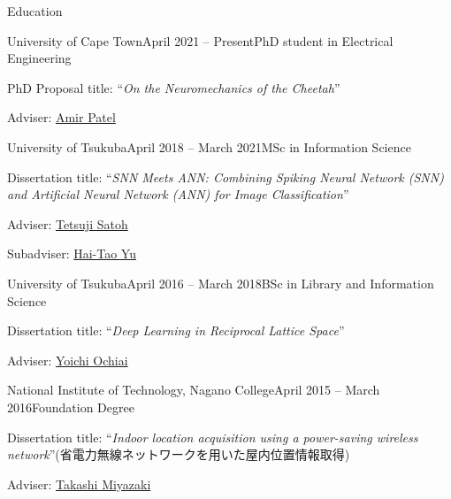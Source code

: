 \documentclass{resume} %
\begin{document}

\begin{rSection}{Education}

    \begin{rSubsection}{University of Cape Town}{April 2021 -- Present}{PhD student in Electrical Engineering}{}
    \item PhD Proposal title: ``{\it On the Neuromechanics of the Cheetah}''
    \item Adviser: \href{https://scholar.google.co.za/citations?user=RxMigV4AAAAJ&view_op=list_works&sortby=pubdate}{Amir Patel}
    \end{rSubsection}

    \begin{rSubsection}{University of Tsukuba}{April 2018 -- March 2021}{MSc in Information Science}{}
    \item Dissertation title: ``{\it SNN Meets ANN: Combining Spiking Neural Network (SNN) and Artificial Neural Network (ANN) for Image Classification}''
    \item Adviser: \href{http://www.slis.tsukuba.ac.jp/~satoh.tetsuji.gf/index.html}{Tetsuji Satoh}
    \item Subadviser: \href{https://scholar.google.co.jp/citations?user=88b2NRsAAAAJ&hl=ja}{Hai-Tao Yu}
    \end{rSubsection}

    \begin{rSubsection}{University of Tsukuba}{April 2016 -- March 2018}{BSc in Library and Information Science}{}
    \item Dissertation title: ``{\it Deep Learning in Reciprocal Lattice Space}''
    \item Adviser: \href{https://scholar.google.co.jp/citations?user=obhH0jkAAAAJ&hl=en}{Yoichi Ochiai}
    \end{rSubsection}

    \begin{rSubsection}{National Institute of Technology, Nagano College}{April 2015 -- March 2016}{Foundation Degree}{}
    \item Dissertation title: ``{\it Indoor location acquisition using a power-saving wireless network}''(省電力無線ネットワークを用いた屋内位置情報取得)
    \item Adviser: \href{https://researchmap.jp/read0178034?lang=en}{Takashi Miyazaki}
    \end{rSubsection}

\end{rSection}
\end{document}
